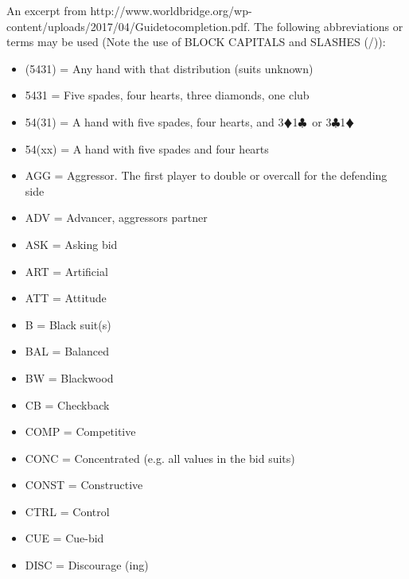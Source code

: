\documentclass[a4paper]{article}
\newcommand{\BC}{\textcolor{OliveGreen}{$\clubsuit$}}
\newcommand{\BD}{\textcolor{RedOrange}{$\vardiamondsuit$}}
\begin{document}
An excerpt from http://www.worldbridge.org/wp-content/uploads/2017/04/Guidetocompletion.pdf.
\bigbreak
The following abbreviations or terms may be used (Note the use of BLOCK
CAPITALS and SLASHES (/)):
\bigbreak
\begin{itemize}
\item (5431)       = Any hand with that distribution (suits unknown)

\item 5431         = Five spades, four hearts, three diamonds, one club

\item 54(31)       = A hand with five spades, four hearts, and 3\BD 1\BC\ or 3\BC 1\BD\ 

\item 54(xx)       = A hand with five spades and four hearts

\item AGG          = Aggressor. The first player to double or overcall for the defending side

\item ADV          = Advancer, aggressors partner

\item ASK          = Asking bid

\item ART          = Artificial

\item ATT          = Attitude

\item B            = Black suit(s)

\item BAL          = Balanced

\item BW           = Blackwood

\item CB           = Checkback

\item COMP         = Competitive

\item CONC         = Concentrated (e.g. all values in the bid suits)

\item CONST        = Constructive

\item CTRL         = Control

\item CUE          = Cue-bid

\item DISC         = Discourage (ing)


\end{itemize}
\end{document}
